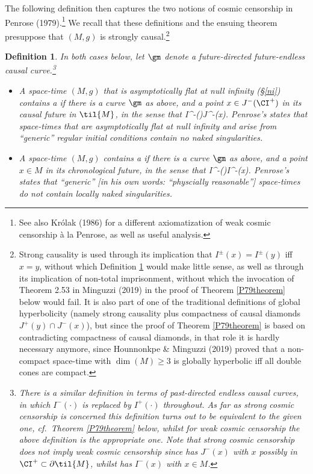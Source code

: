 \documentclass[11pt,a4paper]{article}
\newcommand{\p}{\partial}
\newtheorem{definition}[theorem]{Definition}
\begin{document}
  The following definition then captures the two notions of cosmic censorship in Penrose (1979).\footnote{See also  Kr\'{o}lak (1986) for a  different  axiomatization of weak cosmic censorship \`{a} la Penrose, as well as useful analysis.}
   We recall that these definitions and the ensuing theorem presuppose that $(M,g)$ is strongly causal.\footnote{Strong causality is used through its implication that $I^{\pm}(x)=I^{\pm}(y)$ iff $x=y$, without which Definition \ref{CSdef1} would make little sense, as well as through its implication of non-total imprisonment, without which the invocation of Theorem 2.53 in Minguzzi (2019) in the proof of Theorem \ref{P79theorem} below would fail. It is also part of one of the traditional definitions of global hyperbolicity (namely strong causality plus compactness of causal diamonds $J^+(y)\cap J^-(x)$), but since the proof of  Theorem \ref{P79theorem} is based on contradicting compactness of causal diamonds, in that role it is hardly necessary anymore, since Hounnonkpe \& Minguzzi (2019) proved that  a non-compact space-time with $\dim(M)\geq 3$ is globally hyperbolic iff all  double cones are compact.}
   \begin{definition}\label{CSdef1}
In both cases below, let $\gm$ denote a future-directed future-endless causal curve.\footnote{There is a similar definition in terms of  \emph{past-directed} endless causal curves, in which $I^-(\cdot)$ is replaced by  $I^+(\cdot)$ throughout. As far as strong cosmic censorship is concerned this definition turns out to be equivalent to the given one, cf.\ Theorem \ref{P79theorem} below, whilst for  weak cosmic censorship the above definition is the appropriate one. Note that strong cosmic censorship does not imply weak cosmic censorship since  has $J^-(x)$ with $x$ possibly in $\CI^+\subset\p\til{M}$, whilst  has $I^-(x)$ with $x\in M$.
 } 
  \begin{itemize}
  \item  A space-time $(M,g)$ that is asymptotically flat at null infinity (\S\ref{ni}) contains a  if  there is a curve $\gm$ as above, and a point $x\in J^-(\CI^+)$ in its causal future in $\til{M}$,  in the sense that 
  \beq
  I^-(\gm)\subset J^-(x).  \label{Isubset0}
  \eeq
   Penrose's  states that  space-times that are asymptotically flat at null infinity and arise from  ``ge\-ne\-ric''  regular initial conditions contain no naked singularities.
\item A space-time $(M,g)$  contains a  if there is a curve $\gm$ as above, and a point $x\in M$  in its chronological future, in the sense that
 \beq
I^-(\gm)\subset I^-(x). \label{Isubset}
\eeq
 Penrose's  states that ``ge\-ne\-ric'' [in his own words: ``physcially reasonable''] space-times do not contain locally naked singularities.
\end{itemize}
   \end{definition}
\end{document}
